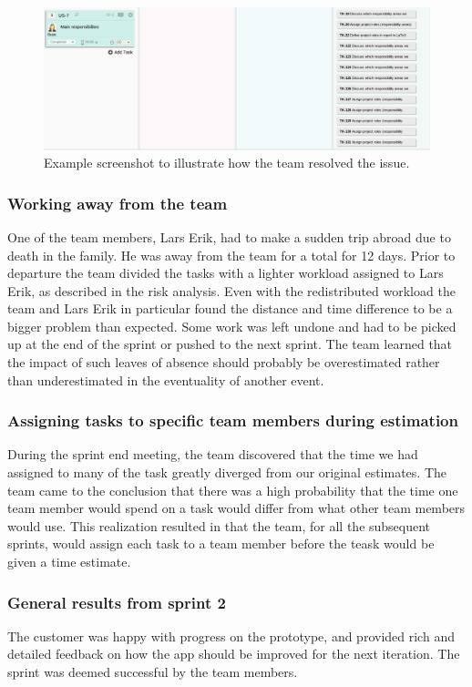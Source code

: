 \begin{figure}[H]
\includegraphics[width=\textwidth]{ch/sprints/fig/addsTasks.png}
\caption{Example screenshot to illustrate how the team resolved the issue.}
\label{fig:addsTasks}
\end{figure}

\subsubsection{Working away from the team}
One of the team members, Lars Erik, had to make a sudden trip abroad due to
death in the family. He was away from the team for a total for 12 days. Prior
to departure the team divided the tasks with a lighter workload assigned to Lars
Erik, as described in the risk analysis. Even with the redistributed workload
the team and Lars Erik in particular found the distance and time difference to
be a bigger problem than expected. Some work was left undone and had to be
picked up at the end of the sprint or pushed to the next sprint. The team
learned that the impact of such leaves of absence should probably be
overestimated rather than underestimated in the eventuality of another event.

\subsubsection{Assigning tasks to specific team members during estimation}
\label{sec:assignEst}
During the sprint end meeting, the team discovered that the time we had assigned to many of the task greatly diverged from our original estimates. The team came to the conclusion that there was a high probability that the time one team member would spend on a task would differ from what other team members would use. This realization resulted in that the team, for all the subsequent sprints, would assign each task to a team member before the teask would be given a time estimate.

\subsubsection{General results from sprint 2} 
The customer was happy with progress on the prototype, and provided rich and detailed feedback on how the app should be improved for the next iteration. The sprint was deemed successful by the team members.
